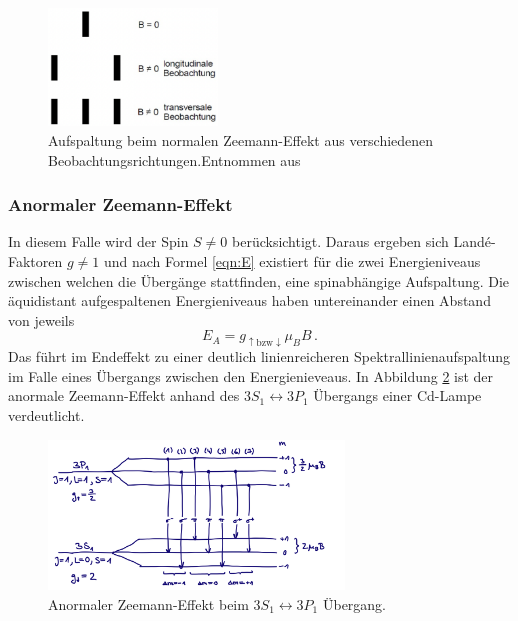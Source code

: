             \begin{figure}[h]
                \centering
                \includegraphics[width = 0.4\textwidth]{pictures/beobachtung.png}
                \caption{Aufspaltung beim normalen Zeemann-Effekt aus verschiedenen Beobachtungsrichtungen.Entnommen aus \cite{haken_atom-_2004}}
                \label{fig:Beob}
            \end{figure}
        \subsubsection{Anormaler Zeemann-Effekt}
            In diesem Falle wird der Spin $S\neq 0$ berücksichtigt.
            Daraus ergeben sich Landé-Faktoren $g\neq 1$ und nach Formel \ref{eqn:E}
            existiert für die zwei Energieniveaus zwischen welchen die Übergänge stattfinden, eine spinabhängige Aufspaltung.
            Die äquidistant aufgespaltenen Energieniveaus haben untereinander einen Abstand von jeweils
            \begin{equation}
                E_A= g_{\uparrow\text{bzw}\downarrow}\mu_BB \, .
            \end{equation}
            Das führt im Endeffekt zu einer deutlich linienreicheren Spektrallinienaufspaltung im Falle eines Übergangs zwischen den Energienieveaus. 
            In Abbildung \ref{fig:ANZ} ist der anormale Zeemann-Effekt anhand des $3S_1\leftrightarrow 3P_1$ Übergangs einer Cd-Lampe verdeutlicht.
            \begin{figure}[h]
                \centering
                \includegraphics[width = 0.7\textwidth]{pictures/anormal.png}
                \caption{Anormaler Zeemann-Effekt beim $3S_1\leftrightarrow 3P_1$ Übergang.}
                \label{fig:ANZ}
            \end{figure}
